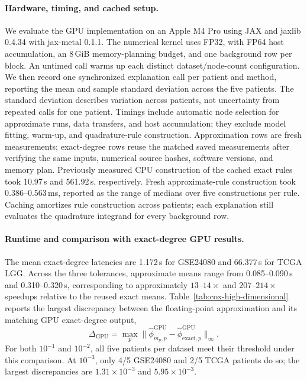 \paragraph{Hardware, timing, and cached setup.}
We evaluate the GPU implementation on an Apple M4 Pro using JAX and
jaxlib 0.4.34 with jax-metal 0.1.1. The numerical kernel uses FP32,
with FP64 host accumulation, an 8\,GiB memory-planning budget, and one
background row per block.
An untimed call warms up each distinct dataset/node-count configuration.
We then record one synchronized explanation call per patient and method,
reporting the mean and sample standard deviation across the five
patients. The standard deviation describes variation across patients,
not uncertainty from repeated calls for one patient. Timings include
automatic node selection for approximate runs, data transfers, and host
accumulation; they exclude model fitting, warm-up, and quadrature-rule
construction. Approximation rows are fresh measurements; exact-degree
rows reuse the matched saved measurements after verifying the same
inputs, numerical source hashes, software versions, and memory plan.
Previously measured CPU construction of the cached exact rules took
10.97\,s and 561.92\,s, respectively. Fresh approximate-rule
construction took 0.386--0.563\,ms, reported as the range of medians
over five constructions per rule. Caching amortizes rule construction
across patients; each explanation still evaluates the quadrature
integrand for every background row.

\paragraph{Runtime and comparison with exact-degree GPU results.}
The mean exact-degree latencies are 1.172\,s for GSE24080 and
66.377\,s for TCGA LGG. Across the three tolerances, approximate
means range from 0.085--0.090\,s and 0.310--0.320\,s,
corresponding to approximately $13$--$14\times$ and
$207$--$214\times$ speedups relative to the reused exact means.
Table~\ref{tab:cox-high-dimensional} reports the largest discrepancy
between the floating-point approximation and its matching GPU
exact-degree output,
\[
 \Delta_{\mathrm{GPU}}=
 \max_p\|\widehat\phi^{\mathrm{GPU}}_{m_p,p}
 -\widehat\phi^{\mathrm{GPU}}_{\mathrm{exact},p}\|_\infty.
\]
For both $10^{-1}$ and $10^{-2}$, all five patients per dataset
meet their threshold under this comparison. At $10^{-3}$, only
4/5 GSE24080 and 2/5 TCGA patients do so; the largest discrepancies
are $1.31\times10^{-3}$ and $5.95\times10^{-3}$.

